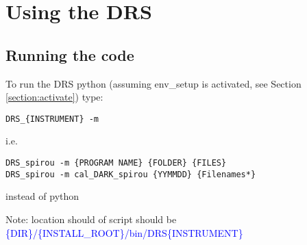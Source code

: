 \chapter{Using the DRS}


\section{Running the code}
\label{section:run_code}

To run the DRS python (assuming env\_setup is activated, see Section \ref{section:activate}) type:
\begin{lstlisting}[style=bashstyle]
DRS_{INSTRUMENT} -m
\end{lstlisting}  

\noindent i.e. 
\begin{lstlisting}[style=bashstyle]
DRS_spirou -m {PROGRAM NAME} {FOLDER} {FILES}
DRS_spirou -m cal_DARK_spirou {YYMMDD} {Filenames*}
\end{lstlisting}  

\noindent instead of python

\noindent Note: location should of script should be \textcolor{blue}{\{DIR\}/\{INSTALL\_ROOT\}/bin/DRS\{INSTRUMENT\}}

